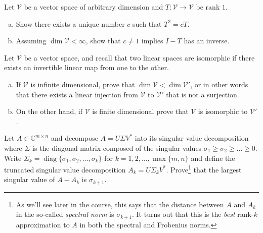\documentclass[12pt,letterpaper,cm]{hmcpset}
\begin{document}
\begin{problem}[1 (Lax 3.14)]
    Let $\mathcal{V}$ be a vector space of arbitrary dimension and $T : \mathcal{V}\to\mathcal{V}$
    be rank $1$.
\begin{enumerate}[(a)]
    \item Show there exists a unique number $c$ such that $T^2 = cT$.
    \item Assuming $\dim\mathcal{V}<\infty$, show that $c\neq 1$ implies $I-T$ has an inverse.
\end{enumerate}
\end{problem}

\begin{solution}
    \vfill
\end{solution}

\begin{problem}[2]
    Let $\mathcal{V}$ be a vector space, and recall that two linear spaces are
    isomorphic if there exists an invertible linear map from one to the other.
\begin{enumerate}[(a)]
    \item If $\mathcal{V}$ is infinite dimensional, prove that $\dim\mathcal{V} < \dim\mathcal{V}'$,
        or in other words that there exists a linear injection from $\mathcal{V}$ to $\mathcal{V}'$ that is not a surjection.
    \item On the other hand, if $\mathcal{V}$ is finite dimensional prove that
        $\mathcal{V}$ is isomorphic to $\mathcal{V}'$.
\end{enumerate}
\end{problem}

\begin{solution}
    \vfill
\end{solution}
\clearpage

\begin{problem}[3]
    Let $A\in\mathbb{C}^{m\times n}$ and decompose $A = U \Sigma V^*$ into its singular value
    decomposition where $\Sigma$ is the diagonal matrix composed of the singular values
    $\sigma_1\geq\sigma_2\geq \dots\geq 0$. Write $\Sigma_k = \operatorname{diag}\{\sigma_1,\sigma_2
    ,\ldots,\sigma_k\}$ for $k=1,2,\ldots,\max\{m,n\}$ and define the truncated singular value decomposition
    $A_k = U\Sigma_k V^*$. Prove\footnote{As we'll see later in the course, this says that the distance between
    $A$ and $A_k$ in the so-called \emph{spectral norm} is $\sigma_{k+1}$. It turns out that this is the
    \emph{best} rank-$k$ approximation to $A$ in both the spectral and Frobenius norms.}
    that the largest singular value of $A - A_k$ is $\sigma_{k+1}$.
\end{problem}
\end{document}
